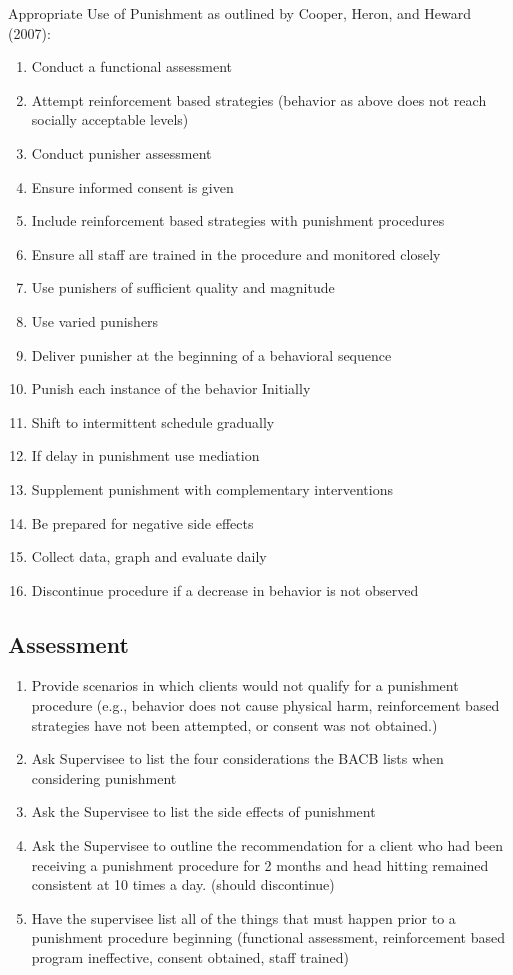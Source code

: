 Appropriate Use of Punishment as outlined by Cooper, Heron, and Heward (2007):
\begin{enumerate}
\item Conduct a functional assessment
\item Attempt reinforcement based strategies (behavior as above does not reach socially acceptable levels)
\item Conduct punisher assessment
\item Ensure informed consent is given
\item Include reinforcement based strategies with punishment procedures
\item Ensure all staff are trained in the procedure and monitored closely
\item Use punishers of sufficient quality and magnitude
\item Use varied punishers
\item Deliver punisher at the beginning of a behavioral sequence
\item Punish each instance of the behavior Initially
\item Shift to intermittent schedule gradually
\item If delay in punishment use mediation
\item Supplement punishment with complementary interventions
\item Be prepared for negative side effects
\item Collect data, graph and evaluate daily
\item Discontinue procedure if a decrease in behavior is not observed
\end{enumerate}
%
\subsection{Assessment}
\begin{enumerate}
\item Provide scenarios in which clients would not qualify for a punishment procedure (e.g., behavior does not cause physical harm, reinforcement based strategies have not been attempted, or consent was not obtained.)
\item Ask Supervisee to list the four considerations the BACB lists when considering punishment
\item Ask the Supervisee to list the side effects of punishment
\item Ask the Supervisee to outline the recommendation for a client who had been receiving a punishment procedure for 2 months and head hitting remained consistent at 10 times a day. (should discontinue)
\item Have the supervisee list all of the things that must happen prior to a punishment procedure beginning (functional assessment, reinforcement based program ineffective, consent obtained, staff trained)
\end{enumerate}
%
